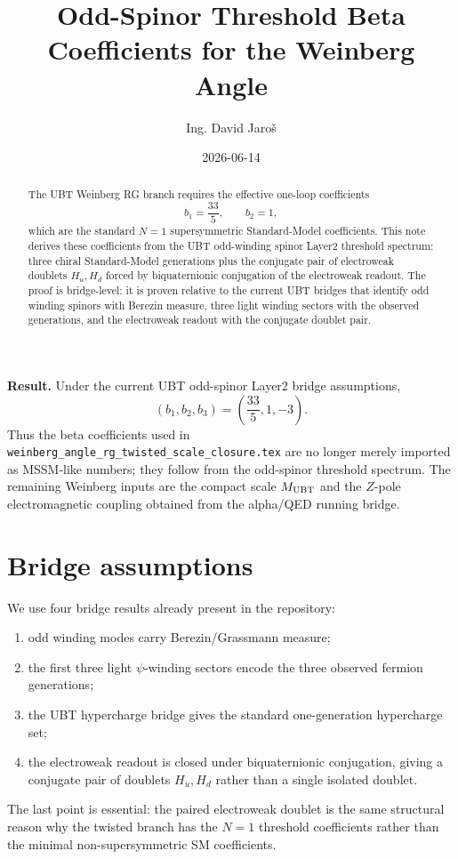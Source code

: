 \documentclass[12pt,a4paper]{article}
\title{Odd-Spinor Threshold Beta Coefficients for the Weinberg Angle}
\author{Ing. David Jaroš}
\date{2026-06-14}
\begin{document}
\maketitle

\begin{abstract}
The UBT Weinberg RG branch requires the effective one-loop coefficients
\[
  b_1=\frac{33}{5},\qquad b_2=1,
\]
which are the standard $N=1$ supersymmetric Standard-Model coefficients.
This note derives these coefficients from the UBT odd-winding spinor Layer2
threshold spectrum: three chiral Standard-Model generations plus the conjugate
pair of electroweak doublets $H_u,H_d$ forced by biquaternionic conjugation of
the electroweak readout.  The proof is bridge-level: it is proven relative to
the current UBT bridges that identify odd winding spinors with Berezin measure,
three light winding sectors with the observed generations, and the electroweak
readout with the conjugate doublet pair.
\end{abstract}

\begin{statusbox}
\textbf{Result.}  Under the current UBT odd-spinor Layer2 bridge assumptions,
\[
  (b_1,b_2,b_3)=\left(\frac{33}{5},1,-3\right).
\]
Thus the beta coefficients used in
\texttt{weinberg\_angle\_rg\_twisted\_scale\_closure.tex} are no longer merely
imported as MSSM-like numbers; they follow from the odd-spinor threshold
spectrum.  The remaining Weinberg inputs are the compact scale $M_{\rm UBT}$
and the $Z$-pole electromagnetic coupling obtained from the alpha/QED running
bridge.
\end{statusbox}

\section{Bridge assumptions}

We use four bridge results already present in the repository:
\begin{enumerate}
  \item odd winding modes carry Berezin/Grassmann measure;
  \item the first three light $\psi$-winding sectors encode the three observed
  fermion generations;
  \item the UBT hypercharge bridge gives the standard one-generation
  hypercharge set;
  \item the electroweak readout is closed under biquaternionic conjugation,
  giving a conjugate pair of doublets $H_u,H_d$ rather than a single isolated
  doublet.
\end{enumerate}
The last point is essential: the paired electroweak doublet is the same
structural reason why the twisted branch has the $N=1$ threshold coefficients
rather than the minimal non-supersymmetric SM coefficients.
\end{document}

